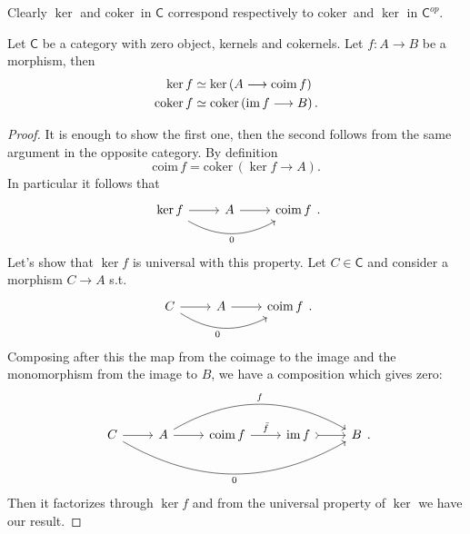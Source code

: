\documentclass[../Main]{subfiles}
\begin{document}
\begin{rem}[]
	Clearly $\ker$ and $\mathrm{coker}\, $ in $\mathsf{C}$ correspond respectively to
	$\mathrm{coker}\, $ and $\ker$ in $\mathsf{C}^{op}$.
\end{rem}

\begin{lem}
	Let $\mathsf{C}$ be a category with zero object, kernels and cokernels.
	Let $f\colon A \to B$ be a morphism, then
	\begin{align}
		\ker f &\simeq \ker \left( A \longrightarrow \mathrm{coim}\, f \right)\\
		\mathrm{coker}\, f &\simeq \mathrm{coker} \left( \operatorname{im} f \longrightarrow B \right)
	.\end{align} 
\end{lem} 
\begin{proof}
	It is enough to show the first one, then the second follows from
	the same argument in the opposite category.
	By definition
	\begin{equation}
		\mathrm{coim}\, f = \mathrm{coker}\,  \left( \ker f \to  A \right)
	.\end{equation} 
	In particular it follows that
	\begin{equation}
	\begin{tikzcd}
		\ker f \arrow[r, "", rightarrow] \arrow[rr, bend right, "0"', rightarrow] &
		A \arrow[r, "", rightarrow] &
		\mathrm{coim}\, f
	\end{tikzcd}
	.\end{equation} 
	Let's show that $\ker f$ is universal with this property.
	Let $C \in \mathsf{C}$ and consider a morphism $C \to A$ s.t.
	\begin{equation}
	\begin{tikzcd}
		C \arrow[r, "", rightarrow] \arrow[rr, bend right, "0"', rightarrow] &
		A \arrow[r, "", rightarrow] &
		\mathrm{coim}\, f
	\end{tikzcd}
	.\end{equation} 
	Composing after this the map from the coimage to the image
	and the monomorphism from the image to $B$, we have a composition which gives zero:
	\begin{equation}
	\begin{tikzcd}
		C \arrow[r, "", rightarrow] \arrow[rrrr, bend right, "0"', rightarrow] &
		A \arrow[r, "", rightarrow] \arrow[rrr, "f", bend left, rightarrow] &
		\mathrm{coim}\, f \arrow[r, "\bar{f}", rightarrow] &
		\ima f \arrow[r, "", rightarrowtail] &
		B
	\end{tikzcd}
	.\end{equation} 
	Then it factorizes through $\ker f$ and from the universal property of $\ker$ we have our result.
\end{proof}
\end{document}
